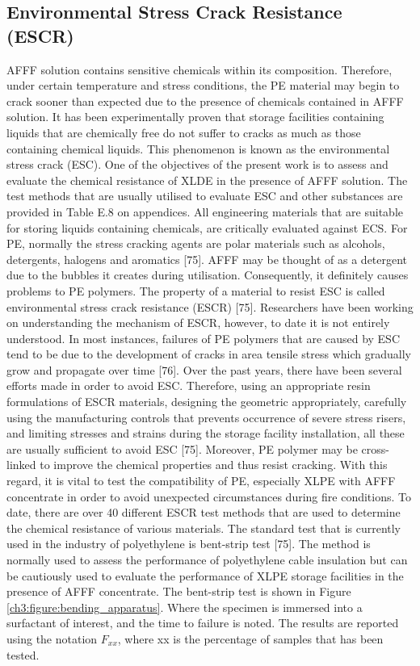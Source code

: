 \documentclass[12pt]{report}
\begin{document}
\subsection{Environmental Stress Crack Resistance (ESCR)}
AFFF solution contains sensitive chemicals within its composition. Therefore, under certain temperature and stress conditions, the PE material may begin to crack sooner than expected due to the presence of chemicals contained in AFFF solution. It has been experimentally proven that storage facilities containing liquids that are chemically free do not suffer to cracks as much as those containing chemical liquids. This phenomenon is known as the environmental stress crack (ESC). One of the objectives of the present work is to assess and evaluate the chemical resistance of XLDE in the presence of AFFF solution. The test methods that are usually utilised to evaluate ESC and other substances are provided in Table E.8 on appendices. 
All engineering materials that are suitable for storing liquids containing chemicals, are critically evaluated against ECS. For PE, normally the stress cracking agents are polar materials such as alcohols, detergents, halogens and aromatics [75]. AFFF may be thought of as a detergent due to the bubbles it creates during utilisation. Consequently, it definitely causes problems to PE polymers. The property of a material to resist ESC is called environmental stress crack resistance (ESCR) [75]. Researchers have been working on understanding the mechanism of ESCR, however, to date it is not entirely understood. In most instances, failures of PE polymers that are caused by ESC tend to be due to the development of cracks in area tensile stress which gradually grow and propagate over time [76]. 
Over the past years, there have been several efforts made in order to avoid ESC. Therefore, using an appropriate resin formulations of ESCR materials, designing the geometric appropriately, carefully using the manufacturing controls that prevents occurrence of severe stress risers, and limiting stresses and strains during the storage facility installation, all these are usually sufficient to avoid ESC [75]. Moreover, PE polymer may be cross-linked to improve the chemical properties and thus resist cracking.  With this regard, it is vital to test the compatibility of PE, especially XLPE with AFFF concentrate in order to avoid unexpected circumstances during fire conditions. To date, there are over 40 different ESCR test methods that are used to determine the chemical resistance of various materials. The standard test that is currently used in the industry of polyethylene is bent-strip test [75]. The method is normally used to assess the performance of polyethylene cable insulation but can be cautiously used to evaluate the performance of XLPE storage facilities in the presence of AFFF concentrate. The bent-strip test is shown in Figure \ref{ch3:figure:bending_apparatus}. Where the specimen is immersed into a surfactant of interest, and the time to failure is noted. The results are reported using the notation $F_{xx}$, where xx is the percentage of samples that has been tested.
 
\end{document}
